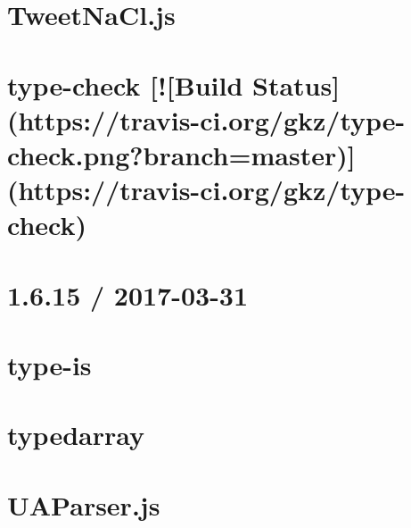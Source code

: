 \documentclass[twoside]{book}
\newcommand{\+}{\discretionary{\mbox{\scriptsize$\hookleftarrow$}}{}{}}
\begin{document}
\chapter{Tweet\+Na\+Cl.\+js}
\label{md__c_1_workspace_demo_src_main_script_node_modules_tweetnacl__r_e_a_d_m_e}

\chapter{type-\/check \mbox{[}!\mbox{[}Build Status\mbox{]}(https\+://travis-\/ci.org/gkz/type-\/check.png?branch=master)\mbox{]}(https\+://travis-\/ci.org/gkz/type-\/check)}
\label{md__c_1_workspace_demo_src_main_script_node_modules_type-check__r_e_a_d_m_e}

\chapter{1.6.15 / 2017-\/03-\/31}
\label{md__c_1_workspace_demo_src_main_script_node_modules_type-is__h_i_s_t_o_r_y}

\chapter{type-\/is}
\label{md__c_1_workspace_demo_src_main_script_node_modules_type-is__r_e_a_d_m_e}

\chapter{typedarray}
\label{md__c_1_workspace_demo_src_main_script_node_modules_typedarray_readme}

\chapter{U\+A\+Parser.\+js}
\label{md__c_1_workspace_demo_src_main_script_node_modules_ua-parser-js_readme}

\end{document}
